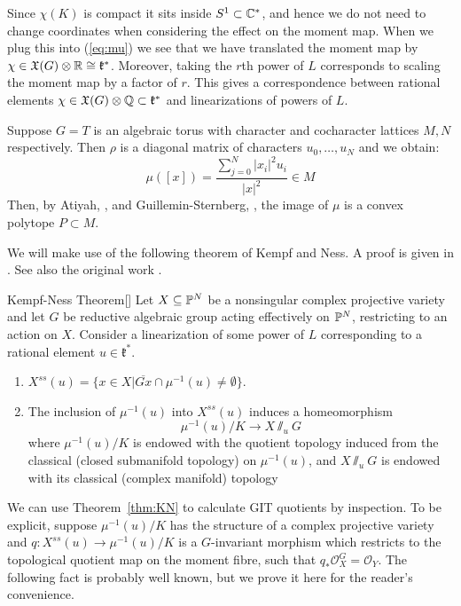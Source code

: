Since \(\chi(K)\) is compact it sits inside \(S^1 \subset \mathbb{C}^*\), and hence we do not need to change coordinates when considering the effect on the moment map. When we plug this into (\ref{eq:mu}) we see that we have translated the moment map by \(\chi \in \mathfrak{X}(G) \otimes \mathbb{R} \cong \mathfrak{k}^*\). Moreover, taking the \(r\)th power of \(L\) corresponds to scaling the moment map by a factor of \(r\). This gives a correspondence between rational elements \(\chi \in \mathfrak{X}(G) \otimes \mathbb{Q} \subset \mathfrak{k}^*\) and linearizations of powers of \(L\).
\begin{example}
Suppose \(G = T\) is an algebraic torus with character and cocharacter lattices \(M,N\) respectively. Then \(\rho\) is a diagonal matrix of characters \(u_0,\dots,u_{N}\) and we obtain:
\[
\mu([x]) = \frac{\sum_{j=0}^N |x_i|^2 u_i}{|x|^2} \in M
\]
Then, by Atiyah, \cite{atiyah1982convexity}, and Guillemin-Sternberg, \cite{guillemin1982convexity}, the image of \(\mu\) is a convex polytope \(P \subset M\).
\end{example}
%
%
%
We will make use of the following theorem of Kempf and Ness. A proof is given in \cite[Chapter 8]{mumford1994}. See also the original work \cite{kempf1979}.
\begin{namedthm}{Kempf-Ness Theorem}[{\cite[Theorem 8.3]{kempf1979}}]\label{thm:KN}
Let \(X \subseteq \mathbb{P}^N\) be a nonsingular complex projective variety and let \(G\) be reductive algebraic group acting effectively on \(\mathbb{P}^N\), restricting to an action on \(X\). Consider a linearization of some power of \(L\) corresponding to a rational element \(u \in \mathfrak{k}^*\).
\begin{enumerate}
\item \(X^{ss}(u) = \{ x \in X | \overline{Gx} \cap \mu^{-1}(u) \neq \emptyset \} \). \\
\item The inclusion of \(\mu^{-1}(u)\) into \(X^{ss}(u)\) induces a homeomorphism
\[
\mu^{-1}(u)/K \to X\sslash_u G
\]
where \(\mu^{-1}(u)/K\) is endowed with the quotient topology induced from the classical (closed submanifold topology) on \(\mu^{-1}(u)\), and \(X \sslash_u G\) is endowed with its classical (complex manifold) topology
\end{enumerate}
\end{namedthm}
%
%
%
We can use Theorem~\ref{thm:KN} to calculate GIT quotients by inspection. To be explicit, suppose \(\mu^{-1}(u)/K\) has the structure of a complex projective variety and \(q: X^{ss}(u) \to \mu^{-1}(u)/K\) is a \(G\)-invariant morphism which restricts to the topological quotient map on the moment fibre, such that \(q_* \mathcal{O}_X^G = \mathcal{O}_Y\). The following fact is probably well known, but we prove it here for the reader's convenience.
